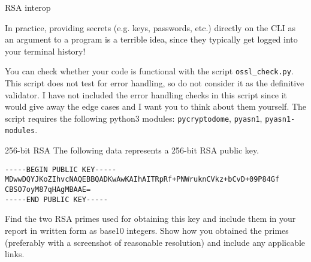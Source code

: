 \documentclass{homework}
\begin{document}
\begin{task}{RSA interop}
  \begin{tcolorbox}[title=Reminder]
    In practice, providing secrets (e.g. keys, passwords, etc.) directly on the CLI as an argument to a program is a terrible idea, since they typically get logged into your terminal history!
  \end{tcolorbox}

  You can check whether your code is functional with the script \texttt{ossl\_check.py}.
  This script does not test for error handling, so do not consider it as the definitive validator.
  I have not included the error handling checks in this script since it would give away the edge cases and I want you to think about them yourself.
  The script requires the following python3 modules: \texttt{pycryptodome}, \texttt{pyasn1}, \texttt{pyasn1-modules}.

  \iffalse
  \begin{tcolorbox}[title=Reading comprehension]
    Beware!
    If you submit a homework which:
    \begin{itemize}
      \item does not pass the test script \textbf{and}
      \item do not mention this in your report \textbf{and}
      \item do not describe in your report what you tried and what problems you still have,
    \end{itemize}
    I will consider your homework as unsubmitted for grading.
    If the deadline hits with your homework in this state, you fail the homework.
    \tcblower
    Motivation: in cryptography (and cybersecurity in general), paying close attention to details is crucial.
    If you cannot be bothered to pay attention and check whether things work, you should not work in cryptography.
  \end{tcolorbox}
  \fi
\end{task}

\begin{task}{256-bit RSA}
  The following data represents a 256-bit RSA public key.
  \begin{Verbatim}
-----BEGIN PUBLIC KEY-----
MDwwDQYJKoZIhvcNAQEBBQADKwAwKAIhAITRpRf+PNWruknCVkz+bCvD+09P84Gf
CBSO7oyM87qHAgMBAAE=
-----END PUBLIC KEY-----
  \end{Verbatim}
  Find the two RSA primes used for obtaining this key and include them in your report in written form as base10 integers.
  Show how you obtained the primes (preferably with a screenshot of reasonable resolution) and include any applicable links.
\end{task}
\end{document}
